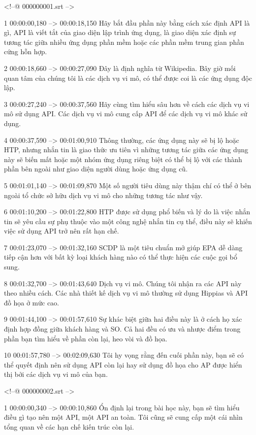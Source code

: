 <!--@ 000000001.srt -->

1
00:00:00,180 --> 00:00:18,150
Hãy bắt đầu phần này bằng cách xác định API là gì, API là viết tắt của giao diện lập trình ứng dụng, là giao diện xác định sự tương tác giữa nhiều ứng dụng phần mềm hoặc các phần mềm trung gian phần cứng hỗn hợp.

2
00:00:18,660 --> 00:00:27,090
Đây là định nghĩa từ Wikipedia.  Bây giờ mối quan tâm của chúng tôi là các dịch vụ vi mô, có thể được coi là các ứng dụng độc lập.

3
00:00:27,240 --> 00:00:37,560
Hãy cùng tìm hiểu sâu hơn về cách các dịch vụ vi mô sử dụng API.  Các dịch vụ vi mô cung cấp API để các dịch vụ vi mô khác sử dụng.

4
00:00:37,590 --> 00:01:00,910
Thông thường, các ứng dụng này sẽ bị lộ hoặc HTP, nhưng nhắn tin là giao thức ưu tiên vì những tương tác giữa các ứng dụng này sẽ biến mất hoặc một nhóm ứng dụng riêng biệt có thể bị lộ với các thành phần bên ngoài như giao diện người dùng hoặc ứng dụng cũ.

5
00:01:01,140 --> 00:01:09,870
Một số người tiêu dùng này thậm chí có thể ở bên ngoài tổ chức sở hữu dịch vụ vi mô cho những tương tác như vậy.

6
00:01:10,200 --> 00:01:22,800
HTP được sử dụng phổ biến và lý do là việc nhắn tin sẽ yêu cầu sự phụ thuộc vào một công nghệ nhắn tin cụ thể, điều này sẽ khiến việc sử dụng API trở nên rất hạn chế.

7
00:01:23,070 --> 00:01:32,160
SCDP là một tiêu chuẩn mở giúp EPA dễ dàng tiếp cận hơn với bất kỳ loại khách hàng nào có thể thực hiện các cuộc gọi bổ sung.

8
00:01:32,700 --> 00:01:43,640
Dịch vụ vi mô.  Chúng tôi nhận ra các API này theo nhiều cách.  Các nhà thiết kế dịch vụ vi mô thường sử dụng Hippias và API đồ họa ở mức cao.

9
00:01:44,100 --> 00:01:57,610
Sự khác biệt giữa hai điều này là ở cách họ xác định hợp đồng giữa khách hàng và SO.  Cả hai đều có ưu và nhược điểm trong phần bạn tìm hiểu về phần còn lại, heo vòi và đồ họa.

10
00:01:57,780 --> 00:02:09,630
Tôi hy vọng rằng đến cuối phần này, bạn sẽ có thể quyết định nên sử dụng API còn lại hay sử dụng đồ họa cho AP được hiển thị bởi các dịch vụ vi mô của bạn.

<!--@ 000000002.srt -->

1
00:00:00,340 --> 00:00:10,860
Ổn định lại trong bài học này, bạn sẽ tìm hiểu điều gì tạo nên một API, một API an toàn.  Tôi cũng sẽ cung cấp một cái nhìn tổng quan về các hạn chế kiến ​​trúc còn lại.

